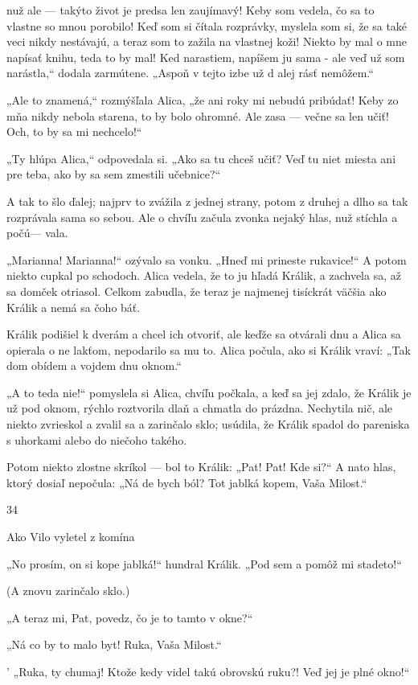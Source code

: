 \documentclass[12pt]{book}
\begin{document}
\begin{Parallel}[p]{}{}
{nuž ale — takýto život je predsa len zaujímavý! Keby
som vedela, čo sa to vlastne so mnou porobilo! Keď som si
čítala rozprávky, myslela som si, že sa také veci nikdy
nestávajú, a teraz som to zažila na vlastnej koži! Niekto by
mal o mne napísať knihu, teda to by mal! Ked narastiem,
napíšem ju sama - ale veď už som narástla,“ dodala
zarmútene. „Aspoň v tejto izbe už d alej rásť nemôžem.“

„Ale to znamená,“ rozmýšľala Alica, „že ani roky mi
nebudú pribúdať! Keby zo mňa nikdy nebola starena, to by
bolo ohromné. Ale zasa — večne sa len učiť! Och, to by
sa mi nechcelo!“

„Ty hlúpa Alica,“ odpovedala si. „Ako sa tu chceš učiť?
Veď tu niet miesta ani pre teba, ako by sa sem zmestili
učebnice?“

A tak to šlo ďalej; najprv to zvážila z jednej strany,
potom z druhej a dlho sa tak rozprávala sama so sebou. Ale
o chvíľu začula zvonka nejaký hlas, nuž stíchla a počú—
vala.

„Marianna! Marianna!“ ozývalo sa vonku. „Hneď mi
prineste rukavice!“ A potom niekto cupkal po schodoch.
Alica vedela, že to ju hľadá Králik, a zachvela sa, až sa
domček otriasol. Celkom zabudla, že teraz je najmenej
tisíckrát väčšia ako Králik a nemá sa čoho báť.

Králik podišiel k dverám a chcel ich otvoriť, ale keďže sa
otvárali dnu a Alica sa opierala o ne lakťom, nepodarilo sa
mu to. Alica počula, ako si Králik vraví: „Tak dom obídem
a vojdem dnu oknom.“

„A to teda nie!“ pomyslela si Alica, chvíľu počkala,
a keď sa jej zdalo, že Králik je už pod oknom, rýchlo
roztvorila dlaň a chmatla do prázdna. Nechytila nič, ale
niekto zvrieskol a zvalil sa a zarinčalo sklo; usúdila, že
Králik spadol do pareniska s uhorkami alebo do niečoho
takého.

Potom niekto zlostne skríkol — bol to Králik: „Pat! Pat!
Kde si?“ A nato hlas, ktorý dosiaľ nepočula: „Ná de bych
ból? Tot jablká kopem, Vaša Milost.“

34

Ako Vilo vyletel z komína

„No prosím, on si kope jablká!“ hundral Králik. „Pod
sem a pomôž mi stadeto!“

(A znovu zarinčalo sklo.)

„A teraz mi, Pat, povedz, čo je to tamto v okne?“

„Ná co by to malo byt! Ruka, Vaša Milost.“

' „Ruka, ty chumaj! Ktože kedy videl takú obrovskú
ruku?! Veď jej je plné okno!“

}
\end{Parallel}
\end{document}
